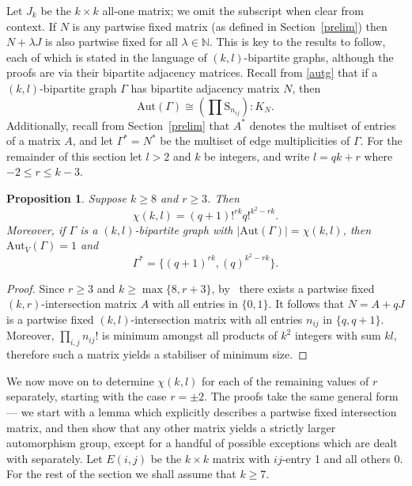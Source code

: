 \documentclass{daj}
\renewcommand\S{\mathrm{S}}
\newcommand\Aut{\mathrm{Aut}}
\theoremstyle{plain}
\newtheorem{proposition}[theorem]{Proposition}
\theoremstyle{definition}
\begin{document}
Let $J_k$ be the $k\times k$ all-one matrix; we omit the subscript when clear from context. If $N$ is any partwise fixed matrix (as defined in Section~\ref{prelim}) then $N+\lambda J$ is also partwise fixed for all $\lambda\in \mathbb{N}$. 
This is key to the results to follow, each of which is stated in the language of $(k,l)$-bipartite graphs, although the proofs are via their bipartite adjacency matrices. Recall from \eqref{autg} that if a $(k,l)$-bipartite graph $\Gamma$ has bipartite adjacency matrix $N$, then $$\Aut(\Gamma)\cong \left(\prod\S_{n_{ij}}\right) :  K_N.$$ Additionally, recall from Section~\ref{prelim} that $A^*$ denotes the multiset of entries of a matrix $A$, and let $\Gamma^{*}=N^{*}$ be the multiset of edge multiplicities of $\Gamma$.
For the remainder of this section let $l>2$ and $k$ be integers, and write $l=qk+r$ where $-2\leq r\leq k-3$.
\begin{proposition}\label{jamesmin}
Suppose $k\geq 8$ and $r\geq 3$. Then $$\chi(k,l)=(q+1)!^{rk}q!^{k^2-rk}.$$ Moreover, if $\Gamma$ is a $(k,l)$-bipartite graph with $|\Aut(\Gamma)|=\chi(k,l)$, then $\Aut_V(\Gamma)=1$ and $$\Gamma^*=\{(q+1)^{rk},(q)^{k^2-rk}\}.$$
\end{proposition}
\begin{proof}
Since $r\geq 3$ and $k\geq \max\{8,r+3\}$, by~\cite[Theorem 1.2]{james} there exists a partwise fixed $(k,r)$-intersection matrix $A$ with all entries in $\{0,1\}$. It follows that $N=A+qJ$ is a partwise fixed $(k,l)$-intersection matrix with all entries $n_{ij}$ in $\{q,q+1\}$. 
Moreover, $\prod_{i,j}n_{ij}!$ is minimum amongst all products of $k^2$ integers with sum $kl$, therefore such a matrix yields a stabiliser of minimum size.
\end{proof}

We now move on to determine $\chi(k,l)$ for each of the remaining values of $r$ separately, starting with the case $r=\pm2$. The proofs take the same general form --- we start with a lemma which explicitly describes a partwise fixed intersection matrix, and then show that any other matrix yields a strictly larger automorphism group, except for a handful of possible exceptions which are dealt with separately. Let $E(i,j)$ be the $k\times k$ matrix with $ij$-entry 1 and all others 0. For the rest of the section we shall assume that $k\geq 7$.
\end{document}
